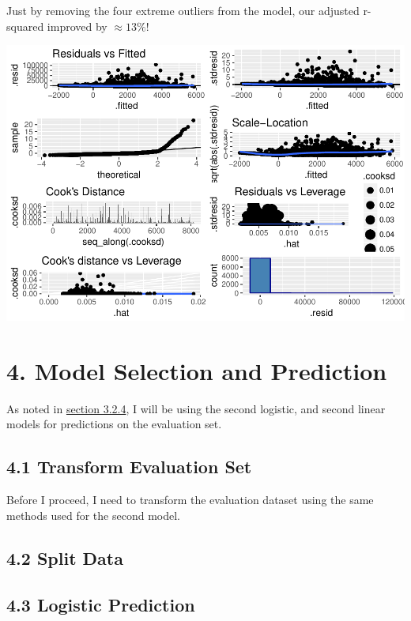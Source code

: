 \documentclass[]{article}
\begin{document}
Just by removing the four extreme outliers from the model, our adjusted
r-squared improved by \(\approx 13\%\)!

\includegraphics{DATA_621_Homework_4_files/figure-latex/lmodel-two-plots-1.pdf}

\section{4. Model Selection and
Prediction}\label{model-selection-and-prediction}

As noted in \protect\hyperlink{final-linear-model}{section 3.2.4}, I
will be using the second logistic, and second linear models for
predictions on the evaluation set.

\subsection{4.1 Transform Evaluation
Set}\label{transform-evaluation-set}

Before I proceed, I need to transform the evaluation dataset using the
same methods used for the second model.

\subsection{4.2 Split Data}\label{split-data}

\subsection{4.3 Logistic Prediction}\label{logistic-prediction}
\end{document}
